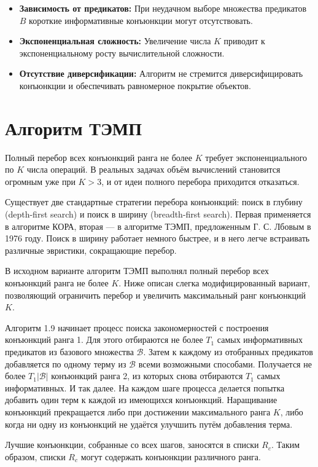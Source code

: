 \begin{itemize}
    \item \textbf{Зависимость от предикатов:} При неудачном выборе множества предикатов \(B\) короткие информативные конъюнкции могут отсутствовать.
    \item \textbf{Экспоненциальная сложность:} Увеличение числа \(K\) приводит к экспоненциальному росту вычислительной сложности.
    \item \textbf{Отсутствие диверсификации:} Алгоритм не стремится диверсифицировать конъюнкции и обеспечивать равномерное покрытие объектов.
\end{itemize}

\section{Алгоритм ТЭМП}

Полный перебор всех конъюнкций ранга не более $K$ требует экспоненциального по $K$ числа операций. В реальных задачах объём вычислений становится огромным уже при $K > 3$, и от идеи полного перебора приходится отказаться.

Существует две стандартные стратегии перебора конъюнкций: поиск в глубину (depth-first search) и поиск в ширину (breadth-first search). Первая применяется в алгоритме КОРА, вторая — в алгоритме ТЭМП, предложенным Г. С. Лбовым в 1976 году. Поиск в ширину работает немного быстрее, и в него легче встраивать различные эвристики, сокращающие перебор.

В исходном варианте алгоритм ТЭМП выполнял полный перебор всех конъюнкций ранга не более $K$. Ниже описан слегка модифицированный вариант, позволяющий ограничить перебор и увеличить максимальный ранг конъюнкций $K$.

Алгоритм 1.9 начинает процесс поиска закономерностей с построения конъюнкций ранга 1. Для этого отбираются не более $T_1$ самых информативных предикатов из базового множества $\mathcal{B}$. Затем к каждому из отобранных предикатов добавляется по одному терму из $\mathcal{B}$ всеми возможными способами. Получается не более $T_1|\mathcal{B}|$ конъюнкций ранга 2, из которых снова отбираются $T_1$ самых информативных. И так далее. На каждом шаге процесса делается попытка добавить один терм к каждой из имеющихся конъюнкций. Наращивание конъюнкций прекращается либо при достижении максимального ранга $K$, либо когда ни одну из конъюнкций не удаётся улучшить путём добавления терма.

Лучшие конъюнкции, собранные со всех шагов, заносятся в списки $R_c$. Таким образом, списки $R_c$ могут содержать конъюнкции различного ранга.

